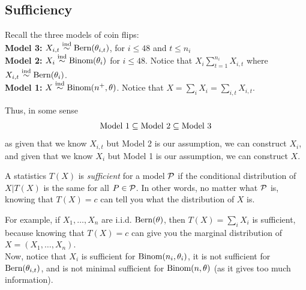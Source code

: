 \subsection*{Sufficiency}
\sectionspace

Recall the three models of coin flips: \\

\textbf{Model 3:} $X_{i, t} \overset{\tt{ind}}{\sim} \tt{Bern}(\theta_{i, t})$, for $i \leq 48$ and $t \leq n_{i}$\\

\textbf{Model 2:} $X_{i} \overset{\tt{ind}}{\sim} \tt{Binom}(\theta_{i})$ for $i \leq 48$. Notice that $X_{i} \sum_{t = 1}^{n_{i}} X_{i, t}$ where $X_{i, t} \overset{\tt{ind}}{\sim} \tt{Bern}(\theta_{i})$.\\

\textbf{Model 1:} $X \overset{\tt{ind}}{\sim} \tt{Binom}(n^{+}, \theta)$. Notice that $X = \sum_{i} X_{i} = \sum_{i, t} X_{i, t}$. 

Thus, in some sense
\[ \text{Model 1} \subseteq \text{Model 2} \subseteq \tt{Model 3} \]
as given that we know $X_{i, t}$ but Model 2 is our assumption, we can construct $X_{i}$, and given that we know $X_{i}$ but Model 1 is our assumption, we can construct $X$.

\begin{definition}
    A statistics $T(X)$ is \emph{sufficient} for a model $\cal{P}$ if the conditional distribution of $X | T(X)$ is the same for all $P \in \cal{P}$. In other words, no matter what $\cal{P}$ is, knowing that $T(X) = c$ can tell you what the distribution of $X$ is. 
\end{definition}

For example, if $X_1, \ldots, X_n$ are i.i.d. $\tt{Bern}(\theta)$, then $T(X) = \sum_{i} X_i$ is sufficient, because knowing that $T(X) = c$ can give you the marginal distribution of $X = (X_1, \ldots, X_n)$.\\

Now, notice that $X_i$ is sufficient for $\tt{Binom}(n_i, \theta_i)$, it is not sufficient for $\tt{Bern}(\theta_{i, t})$, and is not minimal sufficient for $\tt{Binom}(n, \theta)$ (as it gives too much information).

